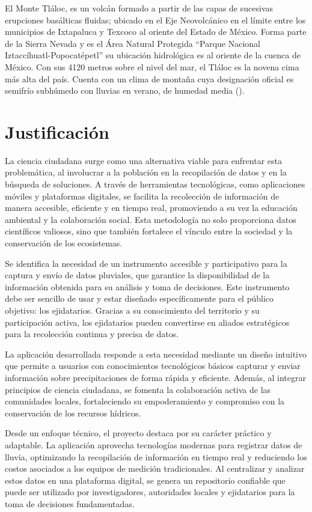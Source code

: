 El Monte Tláloc, es un volcán formado a partir de las capas de sucesivas erupciones basálticas fluidas; ubicado en el Eje Neovolcánico en el límite entre los municipios de Ixtapaluca y Texcoco al oriente del Estado de México. Forma parte de la Sierra Nevada y es el Área Natural Protegida “Parque Nacional Iztaccíhuatl-Popocatépetl” su ubicación hidrológica es al oriente de la cuenca de México. Con sus 4120 metros sobre el nivel del mar, el Tláloc es la novena cima más alta del país. Cuenta con un clima de montaña cuya designación oficial es semifrío subhúmedo con lluvias en verano, de humedad media (\cite{inegi_texcoco}).


\section{Justificación}


La ciencia ciudadana surge como una alternativa viable para enfrentar esta problemática, al involucrar a la población en la recopilación de datos y en la búsqueda de soluciones. A través de herramientas tecnológicas, como aplicaciones móviles y plataformas digitales, se facilita la recolección de información de manera accesible, eficiente y en tiempo real, promoviendo a su vez la educación ambiental y la colaboración social. Esta metodología no solo proporciona datos científicos valiosos, sino que también fortalece el vínculo entre la sociedad y la conservación de los ecosistemas.

Se identifica la necesidad de un instrumento accesible y participativo para la captura y envío de datos pluviales, que garantice la disponibilidad de la información obtenida para su análisis y toma de decisiones. Este instrumento debe ser sencillo de usar y estar diseñado específicamente para el público objetivo: los ejidatarios. Gracias a su conocimiento del territorio y su participación activa, los ejidatarios pueden convertirse en aliados estratégicos para la recolección continua y precisa de datos.

La aplicación desarrollada responde a esta necesidad mediante un diseño intuitivo que permite a usuarios con conocimientos tecnológicos básicos capturar y enviar información sobre precipitaciones de forma rápida y eficiente. Además, al integrar principios de ciencia ciudadana, se fomenta la colaboración activa de las comunidades locales, fortaleciendo su empoderamiento y compromiso con la conservación de los recursos hídricos.

Desde un enfoque técnico, el proyecto destaca por su carácter práctico y adaptable. La aplicación aprovecha tecnologías modernas para registrar datos de lluvia, optimizando la recopilación de información en tiempo real y reduciendo los costos asociados a los equipos de medición tradicionales. Al centralizar y analizar estos datos en una plataforma digital, se genera un repositorio confiable que puede ser utilizado por investigadores, autoridades locales y ejidatarios para la toma de decisiones fundamentadas.

